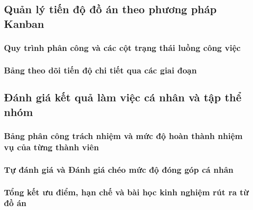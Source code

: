 \subsection{Quản lý tiến độ đồ án theo phương pháp Kanban}

\subsubsection{Quy trình phân công và các cột trạng thái luồng công việc}

\subsubsection{Bảng theo dõi tiến độ chi tiết qua các giai đoạn}

\subsection{Đánh giá kết quả làm việc cá nhân và tập thể nhóm}

\subsubsection{Bảng phân công trách nhiệm và mức độ hoàn thành nhiệm vụ của từng thành viên}

\subsubsection{Tự đánh giá và Đánh giá chéo mức độ đóng góp cá nhân}

\subsubsection{Tổng kết ưu điểm, hạn chế và bài học kinh nghiệm rút ra từ đồ án}
